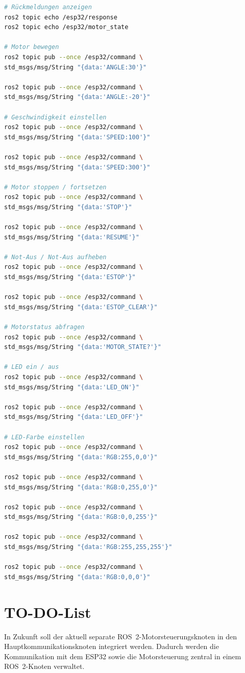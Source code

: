 \documentclass[a4paper,12pt]{article}
\begin{document}
\begin{lstlisting}[language=bash]
# Rückmeldungen anzeigen
ros2 topic echo /esp32/response
ros2 topic echo /esp32/motor_state

# Motor bewegen
ros2 topic pub --once /esp32/command \
std_msgs/msg/String "{data:'ANGLE:30'}"

ros2 topic pub --once /esp32/command \
std_msgs/msg/String "{data:'ANGLE:-20'}"

# Geschwindigkeit einstellen
ros2 topic pub --once /esp32/command \
std_msgs/msg/String "{data:'SPEED:100'}"

ros2 topic pub --once /esp32/command \
std_msgs/msg/String "{data:'SPEED:300'}"

# Motor stoppen / fortsetzen
ros2 topic pub --once /esp32/command \
std_msgs/msg/String "{data:'STOP'}"

ros2 topic pub --once /esp32/command \
std_msgs/msg/String "{data:'RESUME'}"

# Not-Aus / Not-Aus aufheben
ros2 topic pub --once /esp32/command \
std_msgs/msg/String "{data:'ESTOP'}"

ros2 topic pub --once /esp32/command \
std_msgs/msg/String "{data:'ESTOP_CLEAR'}"

# Motorstatus abfragen
ros2 topic pub --once /esp32/command \
std_msgs/msg/String "{data:'MOTOR_STATE?'}"

# LED ein / aus
ros2 topic pub --once /esp32/command \
std_msgs/msg/String "{data:'LED_ON'}"

ros2 topic pub --once /esp32/command \
std_msgs/msg/String "{data:'LED_OFF'}"

# LED-Farbe einstellen
ros2 topic pub --once /esp32/command \
std_msgs/msg/String "{data:'RGB:255,0,0'}"

ros2 topic pub --once /esp32/command \
std_msgs/msg/String "{data:'RGB:0,255,0'}"

ros2 topic pub --once /esp32/command \
std_msgs/msg/String "{data:'RGB:0,0,255'}"

ros2 topic pub --once /esp32/command \
std_msgs/msg/String "{data:'RGB:255,255,255'}"

ros2 topic pub --once /esp32/command \
std_msgs/msg/String "{data:'RGB:0,0,0'}"
\end{lstlisting}


\section{TO-DO-List}

In Zukunft soll der aktuell separate ROS~2-Motorsteuerungsknoten in den Hauptkommunikationsknoten integriert werden. Dadurch werden die Kommunikation mit dem ESP32 sowie die Motorsteuerung zentral in einem ROS~2-Knoten verwaltet.
\end{document}
